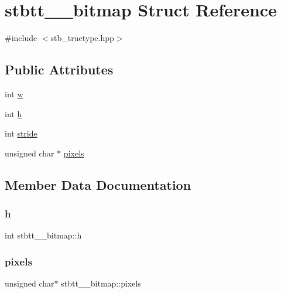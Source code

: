 \hypertarget{structstbtt____bitmap}{}\section{stbtt\+\_\+\+\_\+bitmap Struct Reference}
\label{structstbtt____bitmap}


{\ttfamily \#include $<$stb\+\_\+truetype.\+hpp$>$}

\subsection*{Public Attributes}
\begin{DoxyCompactItemize}
\item 
int \hyperlink{structstbtt____bitmap_afbd607426f0a457b1a871ed902eeb926}{w}
\item 
int \hyperlink{structstbtt____bitmap_a2afc802e26e9f1dda897ac16ecfff10e}{h}
\item 
int \hyperlink{structstbtt____bitmap_a48ee6b550ee4f1d85bfc32c62c0e9a98}{stride}
\item 
unsigned char $\ast$ \hyperlink{structstbtt____bitmap_ae6be77625faf55b110eaaffde5c7733c}{pixels}
\end{DoxyCompactItemize}


\subsection{Member Data Documentation}
\hypertarget{structstbtt____bitmap_a2afc802e26e9f1dda897ac16ecfff10e}{}\label{structstbtt____bitmap_a2afc802e26e9f1dda897ac16ecfff10e} 
\subsubsection{\texorpdfstring{h}{h}}
{\footnotesize\ttfamily int stbtt\+\_\+\+\_\+bitmap\+::h}

\hypertarget{structstbtt____bitmap_ae6be77625faf55b110eaaffde5c7733c}{}\label{structstbtt____bitmap_ae6be77625faf55b110eaaffde5c7733c} 
\subsubsection{\texorpdfstring{pixels}{pixels}}
{\footnotesize\ttfamily unsigned char$\ast$ stbtt\+\_\+\+\_\+bitmap\+::pixels}

